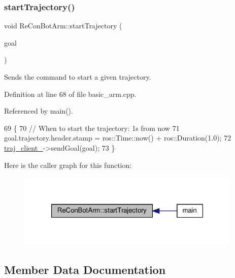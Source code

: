 \subsubsection{\texorpdfstring{start\+Trajectory()}{startTrajectory()}}
{\footnotesize\ttfamily void Re\+Con\+Bot\+Arm\+::start\+Trajectory (\begin{DoxyParamCaption}\item[{control\+\_\+msgs\+::\+Follow\+Joint\+Trajectory\+Goal}]{goal }\end{DoxyParamCaption})\hspace{0.3cm}{\ttfamily [inline]}}



Sends the command to start a given trajectory. 



Definition at line 68 of file basic\+\_\+arm.\+cpp.



Referenced by main().


\begin{DoxyCode}
69     \{
70       \textcolor{comment}{// When to start the trajectory: 1s from now}
71       goal.trajectory.header.stamp = ros::Time::now() + ros::Duration(1.0);
72       \hyperlink{class_re_con_bot_arm_a0be83821f776c5ca9874fabbeaa177cf}{traj\_client\_}->sendGoal(goal);
73     \}
\end{DoxyCode}
Here is the caller graph for this function\+:\nopagebreak
\begin{figure}[H]
\begin{center}
\leavevmode
\includegraphics[width=304pt]{d3/d06/class_re_con_bot_arm_a52f6f89615b17a421d5cd8b51b2962d7_icgraph}
\end{center}
\end{figure}


\subsection{Member Data Documentation}
\mbox{\label{class_re_con_bot_arm_a0be83821f776c5ca9874fabbeaa177cf}} 
